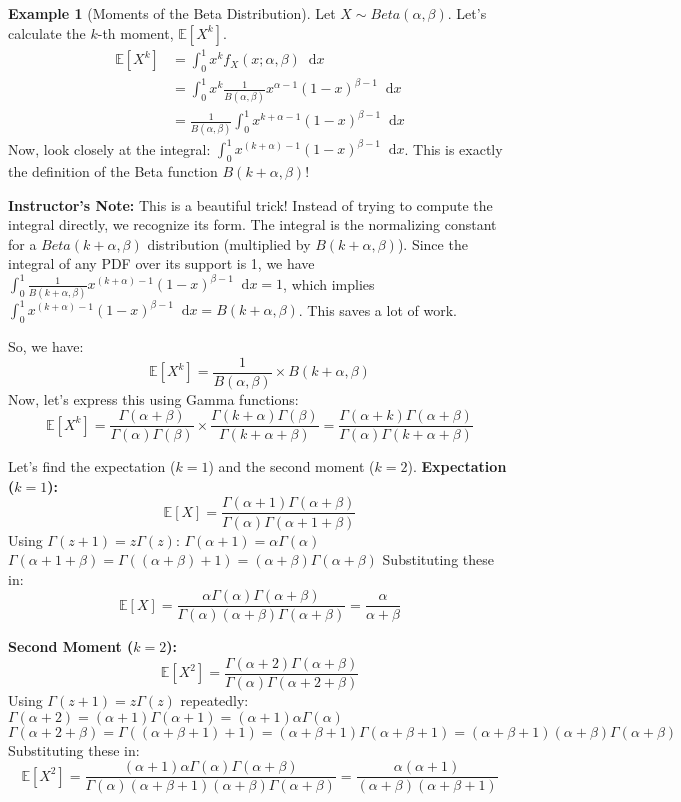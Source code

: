 \documentclass[11pt, letterpaper]{article}
\theoremstyle{plain} %
\theoremstyle{definition} %
\newtheorem{example}[theorem]{Example}
\theoremstyle{remark} %
\newenvironment{instructorcomment}
  {\par\medskip\noindent\begin{framed}\textbf{Instructor's Note:} \normalfont}
  {\end{framed}\medskip}
\newcommand{\E}{\mathbb{E}}
\newcommand{\dee}{\mathop{}\!\mathrm{d}} %
\newcommand{\BetaFunc}{B} %
\begin{document}
\begin{example}[Moments of the Beta Distribution] \label{ex:beta_moments}
Let $X \sim Beta(\alpha, \beta)$. Let's calculate the $k$-th moment, $\E[X^k]$.
\begin{align*} \E[X^k] &= \int_0^1 x^k f_X(x; \alpha, \beta) \dee x \\ &= \int_0^1 x^k \frac{1}{\BetaFunc(\alpha, \beta)} x^{\alpha-1} (1-x)^{\beta-1} \dee x \\ &= \frac{1}{\BetaFunc(\alpha, \beta)} \int_0^1 x^{k+\alpha-1} (1-x)^{\beta-1} \dee x \end{align*}
Now, look closely at the integral: $\int_0^1 x^{(k+\alpha)-1} (1-x)^{\beta-1} \dee x$. This is exactly the definition of the Beta function $\BetaFunc(k+\alpha, \beta)$!

\begin{instructorcomment}
This is a beautiful trick! Instead of trying to compute the integral directly, we recognize its form. The integral is the normalizing constant for a $Beta(k+\alpha, \beta)$ distribution (multiplied by $B(k+\alpha, \beta)$). Since the integral of any PDF over its support is 1, we have $\int_0^1 \frac{1}{B(k+\alpha, \beta)} x^{(k+\alpha)-1} (1-x)^{\beta-1} \dee x = 1$, which implies $\int_0^1 x^{(k+\alpha)-1} (1-x)^{\beta-1} \dee x = B(k+\alpha, \beta)$. This saves a lot of work.
\end{instructorcomment}

So, we have:
\[ \E[X^k] = \frac{1}{\BetaFunc(\alpha, \beta)} \times \BetaFunc(k+\alpha, \beta) \]
Now, let's express this using Gamma functions:
\[ \E[X^k] = \frac{\Gamma(\alpha+\beta)}{\Gamma(\alpha)\Gamma(\beta)} \times \frac{\Gamma(k+\alpha)\Gamma(\beta)}{\Gamma(k+\alpha+\beta)} = \frac{\Gamma(\alpha+k)\Gamma(\alpha+\beta)}{\Gamma(\alpha)\Gamma(k+\alpha+\beta)} \]

Let's find the expectation ($k=1$) and the second moment ($k=2$).
\textbf{Expectation ($k=1$):}
\[ \E[X] = \frac{\Gamma(\alpha+1)\Gamma(\alpha+\beta)}{\Gamma(\alpha)\Gamma(\alpha+1+\beta)} \]
Using $\Gamma(z+1) = z\Gamma(z)$:
$\Gamma(\alpha+1) = \alpha\Gamma(\alpha)$
$\Gamma(\alpha+1+\beta) = \Gamma((\alpha+\beta)+1) = (\alpha+\beta)\Gamma(\alpha+\beta)$
Substituting these in:
\[ \E[X] = \frac{\alpha\Gamma(\alpha)\Gamma(\alpha+\beta)}{\Gamma(\alpha)(\alpha+\beta)\Gamma(\alpha+\beta)} = \frac{\alpha}{\alpha+\beta} \]

\textbf{Second Moment ($k=2$):}
\[ \E[X^2] = \frac{\Gamma(\alpha+2)\Gamma(\alpha+\beta)}{\Gamma(\alpha)\Gamma(\alpha+2+\beta)} \]
Using $\Gamma(z+1) = z\Gamma(z)$ repeatedly:
$\Gamma(\alpha+2) = (\alpha+1)\Gamma(\alpha+1) = (\alpha+1)\alpha\Gamma(\alpha)$
$\Gamma(\alpha+2+\beta) = \Gamma((\alpha+\beta+1)+1) = (\alpha+\beta+1)\Gamma(\alpha+\beta+1) = (\alpha+\beta+1)(\alpha+\beta)\Gamma(\alpha+\beta)$
Substituting these in:
\[ \E[X^2] = \frac{(\alpha+1)\alpha\Gamma(\alpha)\Gamma(\alpha+\beta)}{\Gamma(\alpha)(\alpha+\beta+1)(\alpha+\beta)\Gamma(\alpha+\beta)} = \frac{\alpha(\alpha+1)}{(\alpha+\beta)(\alpha+\beta+1)} \]


\end{example}
\end{document}
